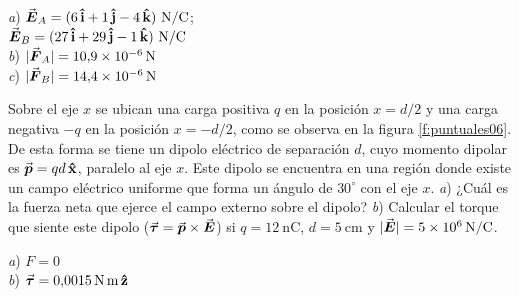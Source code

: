 \begin{Answer}
  \begin{minipage}[t]{.4\textwidth}
    \textit{a}) $\va*{E}_A = (6\,\vu{i} + 1\,\vu{j} -4\,\vu{k})\text{ N/C}$;\\ $\va*{E}_B = (27\,\vu{i} + 29\,\vu{j} -1\,\vu{k})\text{ N/C}$\\ \textit{b}) $|\va*{F}_A| = \SI{10.9E-6}{\newton}$ \\ \textit{c}) $|\va*{F}_B| = \SI{14.4E-6}{\newton}$
  \end{minipage}
\end{Answer}
%
\begin{Exercise}\label{p:puntuales06}
  Sobre el eje $x$ se ubican una carga positiva $q$ en la posición $x = d/2$ y una carga negativa $-q$ en la posición $x = -d/2$, como se observa en la figura \ref{f:puntuales06}. De esta forma se tiene un dipolo eléctrico de separación $d$, cuyo momento dipolar es $\va*{p}=qd\,\vu{x}$, paralelo al eje $x$. Este dipolo se encuentra en una región donde existe un campo eléctrico uniforme que forma un ángulo de $30^\circ$ con el eje $x$. \textit{a}) ¿Cuál es la fuerza neta que ejerce el campo externo sobre el dipolo? \textit{b}) Calcular el torque que siente este dipolo ($\va*{\tau} = \va*{p} \times \va*{E}$) si $q = \SI{12}{\nano\coulomb}$, $d = \SI{5}{\centi\metre}$ y $|\va*{E}| = \SI{5E6}{\newton/\coulomb}$.
\end{Exercise}
\begin{Answer}
  \begin{minipage}[t]{.4\textwidth}
    \textit{a}) $F = 0$\\ \textit{b}) $\va*{\tau} = \SI{0.0015}{\newton.\metre}\,\vu{z}$
  \end{minipage}
\end{Answer}
%
\begin{center}
\end{center}
%